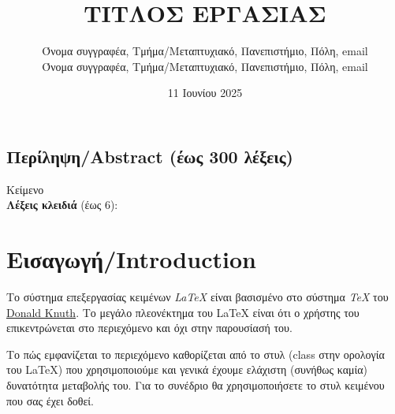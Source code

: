 \documentclass[a4paper,11pt]{article}
\title{
\huge ΤΙΤΛΟΣ ΕΡΓΑΣΙΑΣ
}
\author{Όνομα συγγραφέα, Τμήμα/Μεταπτυχιακό, Πανεπιστήμιο, Πόλη, email \\
Όνομα συγγραφέα, Τμήμα/Μεταπτυχιακό, Πανεπιστήμιο, Πόλη, email}
\date{11 Ιουνίου 2025}
\begin{document}
\maketitle


%
%
\begin{center}
\section*{Περίληψη/Abstract (έως 300 λέξεις)}
Κείμενο    
\[\]
\textbf{Λέξεις κλειδιά} (έως 6):
\end{center}

%
%
\section{Εισαγωγή/Introduction}\label{sec:intro}
Το σύστημα επεξεργασίας κειμένων \emph{\LaTeX} \cite{Lamport86} είναι βασισμένο στο σύστημα \emph{\TeX} του \href{https://en.wikipedia.org/wiki/Donald_Knuth}{Donald Knuth}. Το μεγάλο πλεονέκτημα του {\LaTeX} είναι ότι ο χρήστης του επικεντρώνεται στο περιεχόμενο και όχι στην παρουσίασή του. 

Το πώς εμφανίζεται το περιεχόμενο καθορίζεται από το στυλ (class στην ορολογία του \LaTeX) που χρησιμοποιούμε και γενικά έχουμε ελάχιστη (συνήθως καμία) δυνατότητα μεταβολής του. Για το συνέδριο θα χρησιμοποιήσετε το στυλ κειμένου που σας έχει δοθεί.

\end{document}
